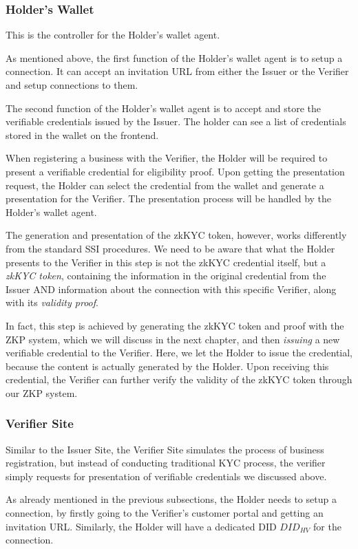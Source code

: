 \documentclass[
]{report}
\begin{document}
\subsubsection{Holder's Wallet}
This is the controller for the Holder's wallet agent.

As mentioned above, the first function of the Holder's wallet agent is to
setup a connection. It can accept an invitation URL from either the Issuer
or the Verifier and setup connections to them.

The second function of the Holder's wallet agent is to accept and store the
verifiable credentials issued by the Issuer. The holder can see a list of
credentials stored in the wallet on the frontend.

When registering a business with the Verifier, the Holder will be required
to present a verifiable credential for eligibility proof. Upon getting the
presentation request, the Holder can select the credential from the wallet
and generate a presentation for the Verifier. The presentation process will
be handled by the Holder's wallet agent.

The generation and presentation of the zkKYC token, however, works
differently from the standard SSI procedures. We need to be aware that
what the Holder presents to the Verifier in this step is not the zkKYC
credential itself, but a \emph{zkKYC token}, containing the information in
the original credential from the Issuer AND information about the connection
with this specific Verifier, along with its \emph{validity proof}.

In fact, this step is achieved by generating the zkKYC token and proof
with the ZKP system, which we will discuss in the next chapter, and then
\emph{issuing} a new verifiable credential to the Verifier. Here, we let
the Holder to issue the credential, because the content is actually
generated by the Holder. Upon receiving this credential, the Verifier
can further verify the validity of the zkKYC token through our ZKP system.

\subsubsection{Verifier Site}
Similar to the Issuer Site, the Verifier Site simulates the process of
business registration, but instead of conducting traditional KYC process,
the verifier simply requests for presentation of verifiable credentials
we discussed above.

As already mentioned in the previous subsections, the Holder needs to
setup a connection, by firstly going to the Verifier's customer portal and
getting an invitation URL. Similarly, the Holder will have a dedicated DID
$DID_{HV}$ for the connection.
\end{document}
